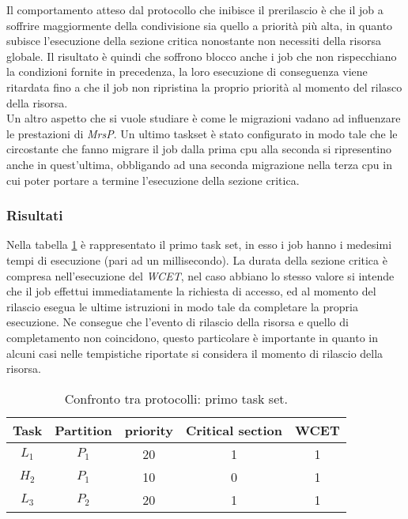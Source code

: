\noindent Il comportamento atteso dal protocollo che inibisce il prerilascio è che il job a soffrire maggiormente della condivisione sia quello a priorità più alta, in quanto subisce l'esecuzione della sezione critica nonostante non necessiti della risorsa globale. Il risultato è quindi che soffrono blocco anche i job che non rispecchiano la condizioni fornite in precedenza, la loro esecuzione di conseguenza viene ritardata fino a che il job non ripristina la proprio priorità al momento del rilasco della risorsa.\\

\noindent Un altro aspetto che si vuole studiare è come le migrazioni vadano ad influenzare le prestazioni di \textit{MrsP}. Un ultimo taskset è stato configurato in modo tale che le circostante che fanno migrare il job dalla prima cpu alla seconda si ripresentino anche in quest'ultima, obbligando ad una seconda migrazione nella terza cpu in cui poter portare a termine l'esecuzione della sezione critica.

\subsubsection{Risultati}
\label{sec:confronto_protocolli_ris}

Nella tabella \ref{tab:test_protocols_Taskset1} è rappresentato il primo task set, in esso i job hanno i medesimi tempi di esecuzione (pari ad un millisecondo). La durata della sezione critica è compresa nell'esecuzione del \textit{WCET}, nel caso abbiano lo stesso valore si intende che il job effettui immediatamente la richiesta di accesso, ed al momento del rilascio esegua le ultime istruzioni in modo tale da completare la propria esecuzione. Ne consegue che l'evento di rilascio della risorsa e quello di completamento non coincidono, questo particolare è importante in quanto in alcuni casi nelle tempistiche riportate si considera il momento di rilascio della risorsa.\\

\begin{table}
  \centering
  \begin{tabular}{ccccc}
	\hline\hline
	    Task & Partition & priority & Critical section & WCET  \\ \hline
	    $L_1$ & $P_1$  & 20 & 1 & 1 \\
	    $H_2$ & $P_1$  & 10 & 0 & 1 \\
    	$L_3$ & $P_2$  & 20 & 1 & 1 \\
  	\hline
  	\end{tabular}
  \caption{Confronto tra protocolli: primo task set.}
  \label{tab:test_protocols_Taskset1}
\end{table}

